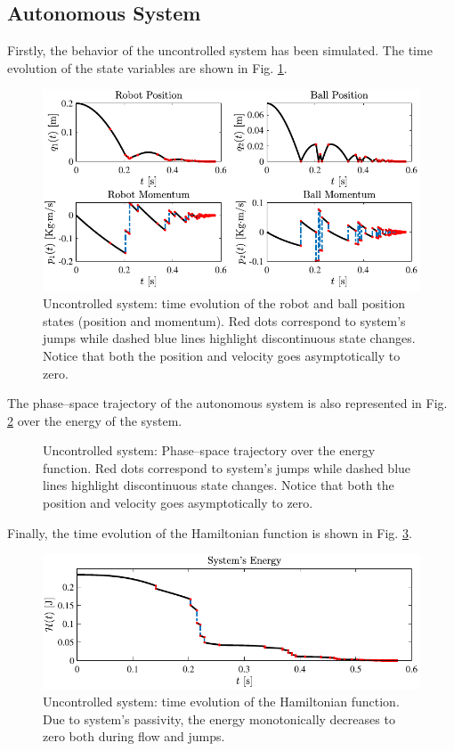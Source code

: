 \subsection{Autonomous System}
%
Firstly, the behavior of the uncontrolled system has been simulated. The time evolution of the state variables are shown in Fig. \ref{fig:aut1}.
%
\begin{figure}[h]
	\centering
	\includegraphics[width = \linewidth]{Figures/aut1.pdf}
	\caption{Uncontrolled system: time evolution of the robot and ball position states (position and momentum). Red dots correspond to system's jumps while dashed blue lines highlight discontinuous state changes. Notice that both the position and velocity goes asymptotically to zero.}
	\label{fig:aut1}
\end{figure}
%
The phase--space trajectory of the autonomous system is also represented in Fig. \ref{fig:aut2} over the energy of the system. 
%
\begin{figure}[h]
	\centering
    
	\caption{Uncontrolled system: Phase--space trajectory over the energy function. Red dots correspond to system's jumps while dashed blue lines highlight discontinuous state changes. Notice that both the position and velocity goes asymptotically to zero.}
	\label{fig:aut2}
\end{figure}
%
Finally, the time evolution of the Hamiltonian function is shown in Fig. \ref{fig:aut3}.
%
\begin{figure}[h]
	\centering
	\includegraphics[width=\linewidth]{Figures/aut3.pdf}
	\caption{Uncontrolled system: time evolution of the Hamiltonian function. Due to system's passivity, the energy monotonically decreases to zero both during flow and jumps.}
	\label{fig:aut3}
\end{figure}
